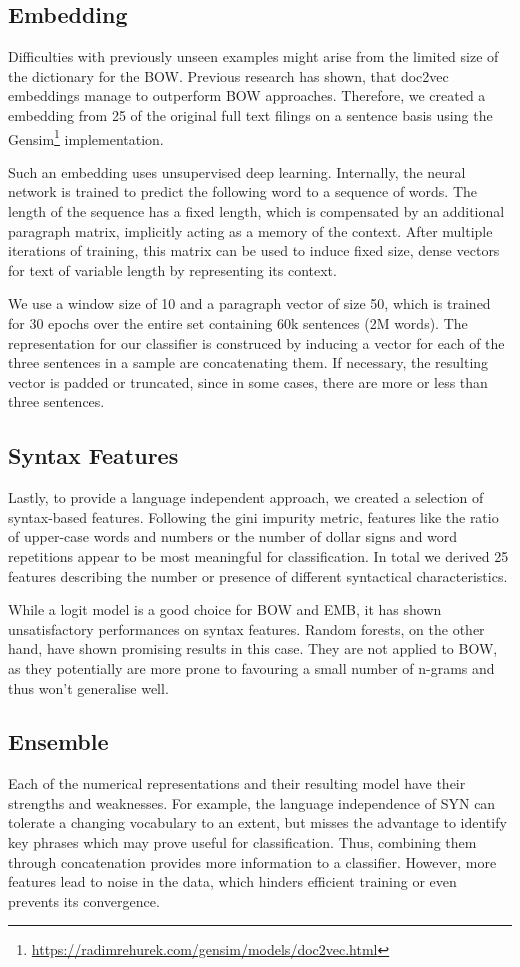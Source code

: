\subsection{Embedding}
Difficulties with previously unseen examples might arise from the limited size of the dictionary for the BOW.
Previous research has shown, that doc2vec embeddings manage to outperform BOW approaches.
Therefore, we created a embedding from 25 of the original full text filings on a sentence basis using the Gensim\footnote{\url{https://radimrehurek.com/gensim/models/doc2vec.html}} implementation.

Such an embedding uses unsupervised deep learning. 
Internally, the neural network is trained to predict the following word to a sequence of words. 
The length of the sequence has a fixed length, which is compensated by an additional paragraph matrix, implicitly acting as a memory of the context.
After multiple iterations of training, this matrix can be used to induce fixed size, dense vectors for text of variable length by representing its context.

We use a window size of 10 and a paragraph vector of size 50, which is trained for 30 epochs over the entire set containing 60k sentences (2M words).
The representation for our classifier is construced by inducing a vector for each of the three sentences in a sample are concatenating them.
If necessary, the resulting vector is padded or truncated, since in some cases, there are more or less than three sentences.

\subsection{Syntax Features}
Lastly, to provide a language independent approach, we created a selection of syntax-based features.
Following the gini impurity metric, features like the ratio of upper-case words and numbers or the number of dollar signs and word repetitions appear to be most meaningful for classification.
In total we derived 25 features describing the number or presence of different syntactical characteristics.

While a logit model is a good choice for BOW and EMB, it has shown unsatisfactory performances on syntax features.
Random forests, on the other hand, have shown promising results in this case.
They are not applied to BOW, as they potentially are more prone to favouring a small number of n-grams and thus won't generalise well.

\subsection{Ensemble}
Each of the numerical representations and their resulting model have their strengths and weaknesses.
For example, the language independence of SYN can tolerate a changing vocabulary to an extent, but misses the advantage to identify key phrases which may prove useful for classification.
Thus, combining them through concatenation provides more information to a classifier.
However, more features lead to noise in the data, which hinders efficient training or even prevents its convergence.

